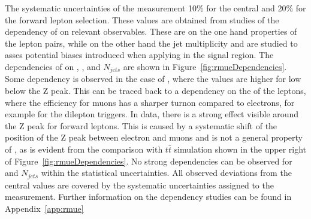 The systematic uncertainties of the measurement 10\% for the central and 20\% for the forward lepton selection. These values are obtained from studies of the dependency of \rmue on relevant observables. These are on the one hand properties of the lepton pairs, while on the other hand the jet multiplicity and \MET are studied to asses potential biases introduced when applying \Rsfof in the signal region. The dependencies of \rmue on \mll, \MET, and $N_{jets}$ are shown in Figure~\ref{fig:rmueDependencies}. Some dependency is observed in the case of \mll, where the values are higher for low \mll below the Z peak. This can be traced back to a dependency on the \pt of the leptons, where the efficiency for muons has a sharper turnon compared to electrons, for example for the dilepton triggers. In data, there is a strong effect visible around the Z peak for forward leptons. This is caused by a systematic shift of the position of the Z peak between electron and muons and is not a general property of \rmue, as is evident from the comparison with $t\bar{t}$ simulation shown in the upper right of Figure~\ref{fig:rmueDependencies}. No strong dependencies can be observed for \MET and $N_{jets}$ within the statistical uncertainties. All observed deviations from the central values are covered by the systematic uncertainties assigned to the measurement. Further information on the dependency studies can be found in Appendix~\ref{app:rmue}
